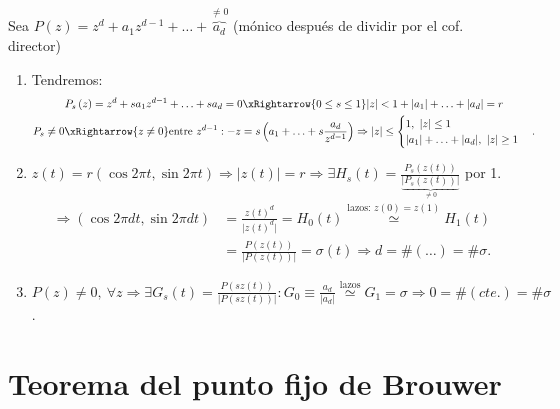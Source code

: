 \begin{demo}
Sea $P\left( z \right) = z^d + a_1z^{d - 1} + \ldots + \overbrace{a_d}^{\neq 0}$ (mónico después de dividir por el cof. director)
\begin{enumerate}
    \item Tendremos:
    \begin{gather*}
        P_s\left( z \right) = z^d + sa_1z^{d - 1} + \ldots + sa_d = 0 \xRightarrow{0 \le s \le 1} \lvert z \rvert < 1 + \lvert a_1 \rvert + \ldots + \lvert a_d \rvert = r\\
        P_s \neq 0 \xRightarrow{z\neq 0} \text{entre } z^{d - 1}: -z = s\left( a_1 + \ldots + s \frac{a_d}{z^{d - 1}} \right) \Rightarrow \lvert z \rvert \le \begin{cases}
            1,\ \lvert z \rvert \le 1\\
            \lvert a_1 \rvert + \ldots + \lvert a_d \rvert,\ \lvert z \rvert \ge 1
        \end{cases} 
    .\end{gather*}

    \item $z\left( t \right) = r\left( \cos 2 \pi t, \sin 2 \pi t \right) \Rightarrow \lvert z \left( t \right)\rvert  = r \Rightarrow \exists H_s\left( t \right) = \frac{P_s\left( z\left( t \right) \right)}{\underbrace{\lvert P_s\left( z\left( t \right) \right) \rvert}_{\neq 0} }$ por 1.
    \begin{align*}
        \Rightarrow \left( \cos 2 \pi dt, \sin 2 \pi dt \right) &= \frac{z\left( t \right)^d}{\lvert z\left( t \right)^d \rvert} = H_0\left( t \right) \stackrel{\text{lazos: } z\left( 0 \right)= z\left( 1 \right)}{\simeq} H_1\left( t \right)\\
        &= \frac{P\left( z\left( t \right) \right)}{\lvert P\left( z \left( t \right) \right) \rvert} = \sigma\left( t \right) \Rightarrow d = \# \left( \ldots \right) = \# \sigma 
    .\end{align*}

    \item $P\left( z \right) \neq 0,\ \forall z \Rightarrow \exists G_s\left( t \right) = \frac{P\left( sz\left( t \right) \right)}{\lvert P\left( sz\left( t \right) \right) \rvert} : G_0 \equiv \frac{a_d}{\lvert a_d \rvert} \stackrel{\text{lazos}}{\simeq} G_1 = \sigma \Rightarrow 0 = \# \left( cte. \right) = \# \sigma$.
\end{enumerate}
\end{demo}

\section{Teorema del punto fijo de Brouwer}%
\label{sec:teorema_del_punto_fijo_de_brouwer}

